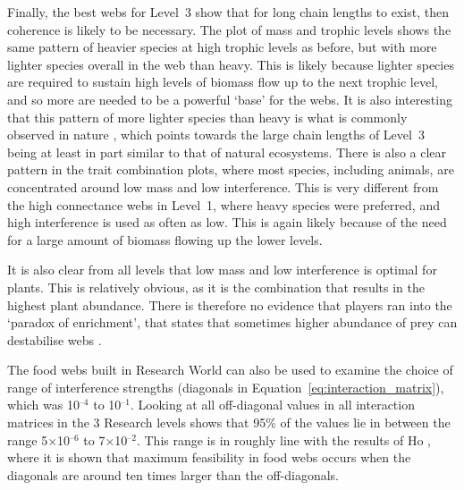 Finally, the best webs for Level~3 show that for long chain lengths to exist, then coherence is likely to be necessary. The plot of mass and trophic levels shows the same pattern of heavier species at high trophic levels as before, but with more lighter species overall in the web than heavy. This is likely because lighter species are required to sustain high levels of biomass flow up to the next trophic level, and so more are needed to be a powerful `base' for the webs.
It is also interesting that this pattern of more lighter species than heavy is what is commonly observed in nature \cite{Fenchel1993}, which points towards the large chain lengths of Level~3 being at least in part similar to that of natural ecosystems.
There is also a clear pattern in the trait combination plots, where most species, including animals, are concentrated around low mass and low interference. This is very different from the high connectance webs in Level~1, where heavy species were preferred, and high interference is used as often as low. This is again likely because of the need for a large amount of biomass flowing up the lower levels.

It is also clear from all levels that low mass and low interference is optimal for plants. This is relatively obvious, as it is the combination that results in the highest plant abundance. There is therefore no evidence that players ran into the `paradox of enrichment', that states that sometimes higher abundance of prey can destabilise webs \cite{Rosenzweig1971}.

The food webs built in Research World can also be used to examine the choice of range of interference strengths (diagonals in Equation~\eqref{eq:interaction_matrix}), which was 10$^{\text{--}4}$ to 10$^{\text{--}1}$. Looking at all off-diagonal values in all interaction matrices in the 3 Research levels shows that 95\% of the values lie in between the range 5$\times$10$^{\text{--}6}$ to 7$\times$10$^{\text{--}2}$. 
This range is in roughly line with the results of Ho \cite{Ho2020}, where it is shown that maximum feasibility in food webs occurs when the diagonals are around ten times larger than the off-diagonals.


